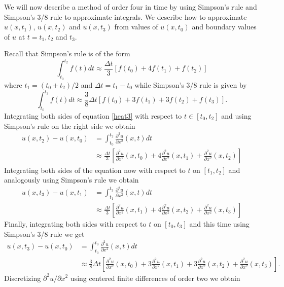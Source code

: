 \documentclass[00main.tex]{subfiles}
\begin{document}

We will now describe a method of order four in time by using Simpson's rule and Simpson's 3/8 rule to approximate integrals. We describe how to approximate $u(x, t_1)$, $u(x,t_2)$ and $u(x,t_3)$ from values of $u(x,t_0)$ and boundary values of $u$ at $t=t_1, t_2$ and $t_3$.

Recall that Simpson's rule is of the form \[ \int_{t_0}^{t_2} f(t) dt \approx \frac{\Delta t}{3} \left[ f(t_0) + 4 f(t_1) + f(t_2) \right] \] where $t_1 = (t_0+t_2)/2$ and $\Delta t = t_1-t_0$ while Simpson's 3/8 rule is given by \[ \int_{t_0}^{t_3} f(t) dt \approx \frac{3}{8} \Delta t \left[ f(t_0) +3f(t_1) + 3 f(t_2) + f(t_3) \right] .\] Integrating both sides of equation \eqref{heat3} with respect to $t \in [t_0,t_2]$ and using Simpson's rule on the right side we obtain \begin{align*}
u(x,t_2) - u(x,t_0) &= \int_{t_0}^{t_2} \frac{\partial^2 u}{\partial x^2} (x,t)dt\\
&\approx \frac{\Delta t}{3} \left[ \frac{\partial^2 u}{\partial x^2} (x,t_0) + 4\frac{\partial^2 u}{\partial x^2} (x,t_1) + \frac{\partial^2 u}{\partial x^2} (x,t_2) \right]
\end{align*} Integrating both sides of the equation now with respect to $t$ on $[t_1,t_2]$ and analogously using Simpson's rule we obtain \begin{align*}
u(x,t_3)- u(x,t_1) &= \int_{t_1}^{t_3} \frac{\partial^2 u}{\partial x^2}(x,t) dt\\
&\approx \frac{\Delta t}{3} \left[ \frac{\partial^2 u}{\partial x^2} (x,t_1) + 4 \frac{\partial^2 u}{\partial x^2} (x,t_2) + \frac{\partial^2 u}{\partial x^2}(x,t_3) \right]
\end{align*} Finally, integrating both sides with respect to $t$ on $[t_0, t_3]$ and this time using Simpson's 3/8 rule we get \begin{align*}
u(x,t_3) - u(x, t_0) &= \int_{t_0}^{t_3} \frac{\partial^2 u}{\partial x^2}(x,t) dt\\
&\approx \frac{3}{8} \Delta t \left[ \frac{\partial^2 u}{\partial x^2}(x,t_0) + 3\frac{\partial^2 u}{\partial x^2}(x,t_1) + 3\frac{\partial^2 u}{\partial x^2}(x,t_2) + \frac{\partial^2 u}{\partial x^2}(x,t_3) \right] .
\end{align*} Discretizing $\partial^2 u/ \partial x^2$ using centered finite differences of order two we obtain
\end{document}
